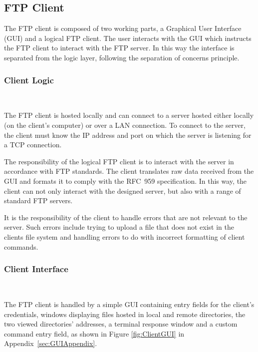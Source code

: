 \documentclass[10pt,twocolumn]{witseiepaper}
\begin{document}
\subsection{FTP Client}

The FTP client is composed of two working parts, a Graphical User Interface (GUI) and a logical FTP client. The user interacts with the GUI which instructs the FTP client to interact with the FTP server. In this way the interface is separated from the logic layer, following the separation of concerns principle.

\vspace*{-2mm}
\subsubsection{Client Logic} $     $

The FTP client is hosted locally and can connect to a server hosted either locally (on the client's computer) or over a LAN connection. To connect to the server, the client must know the IP address and port on which the server is listening for a TCP connection.

The responsibility of the logical FTP client is to interact with the server in accordance with FTP standards. The client translates raw data received from the GUI and formats it to comply with the RFC~959 specification. In this way, the client can not only interact with the designed server, but also  with a range of standard FTP servers.

It is the responsibility of the client to handle errors that are not relevant to the server. Such errors include trying to upload a file that does not exist in the clients file system and handling errors to do with incorrect formatting of client commands.

\vspace*{-2mm}
\subsubsection{Client Interface} $      $\label{GUI}

The FTP client is handled by a simple GUI containing entry fields for the client's credentials, windows displaying files hosted in local and remote directories, the two viewed directories' addresses, a terminal response window and a custom command entry field, as shown in Figure \ref{fig:ClientGUI} in Appendix~\ref{sec:GUIAppendix}. 

\end{document}
